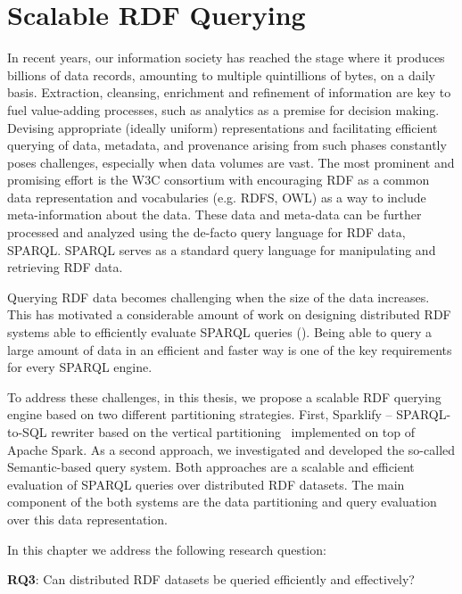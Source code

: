 \chapter{Scalable RDF Querying}
\label{chapter:scalable_rdf_querying}
In recent years, our information society has reached the stage where it produces billions of data records, amounting to multiple quintillions of bytes, on a daily basis.
Extraction, cleansing, enrichment and refinement of information are key to fuel value-adding processes, such as analytics as a premise for decision making.
Devising appropriate (ideally uniform) representations and facilitating efficient querying of data, metadata, and provenance arising from such phases constantly poses challenges, especially when data volumes are vast.
The most prominent and promising effort is the \gls{W3C} consortium with encouraging \gls{RDF} as a common data representation and vocabularies (e.g. \gls{RDFS}, \gls{OWL}) as a way to include meta-information about the data.
These data and meta-data can be further processed and analyzed using the de-facto query language for \gls{RDF} data, \gls{SPARQL}.
\gls{SPARQL} serves as a standard query language for manipulating and retrieving \gls{RDF} data.

Querying \gls{RDF} data becomes challenging when the size of the data increases. 
This has motivated a considerable amount of work on designing distributed \gls{RDF} systems able to efficiently evaluate \gls{SPARQL} queries (\cite{Schatzle:2016:SRQ:2977797.2977806,sparqlgx-iswc-2016}).
Being able to query a large amount of data in an efficient and faster way is one of the key requirements for every \gls{SPARQL} engine.

To address these challenges, in this thesis, we propose a scalable \gls{RDF} querying engine based on two different partitioning strategies.
First, Sparklify -- SPARQL-to-SQL rewriter based on the vertical partitioning~\cite{VPAbadi2007} implemented on top of Apache Spark.
As a second approach, we investigated and developed the so-called Semantic-based query system. 
Both approaches are a scalable and efficient evaluation of \gls{SPARQL} queries over distributed \gls{RDF} datasets. 
The main component of the both systems are the data partitioning and query evaluation over this data representation.

In this chapter we address the following research question:
\begin{tcolorbox}
\textbf{RQ3}: Can distributed \gls{RDF} datasets be queried efficiently and effectively?
\end{tcolorbox}

